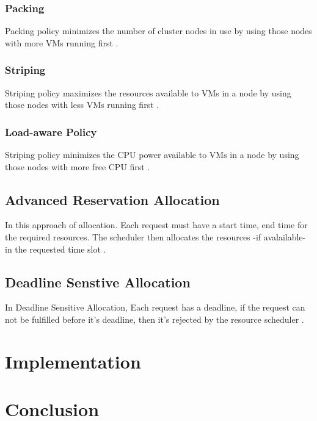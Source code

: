 \documentclass{article}
\begin{document}
\subsubsection{Packing}
Packing policy minimizes the number of cluster nodes in use by using those nodes with more VMs running first \cite{optimaljoint}.

\subsubsection{Striping}
Striping policy maximizes the resources available to VMs in a node by using those nodes with less VMs running first \cite{optimaljoint}.

\subsubsection{Load-aware Policy}
Striping policy minimizes the CPU power available to VMs in a node by using those nodes with more free CPU first \cite{optimaljoint}.

\subsection{Advanced Reservation Allocation}
In this approach of allocation. Each request must have a start time, end time for the required resources. The scheduler then allocates the resources -if avalailable- in the requested time slot \cite{optimaljoint}.

\subsection{Deadline Senstive Allocation}
In Deadline Sensitive Allocation, Each request has a deadline, if the request can not be fulfilled before it's deadline, then it's rejected by the resource scheduler \cite{optimaljoint}.
\newpage


\section{Implementation}

\section{Conclusion}

\newpage


\end{document}
